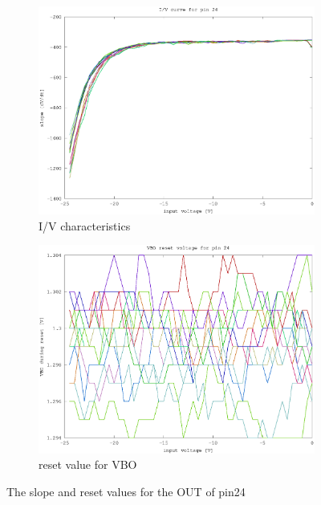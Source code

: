 \begin{figure}[h]
	\centering
	\begin{subfigure}[b]{0.475\textwidth}
	    \centering
	    \includegraphics[width=\textwidth]{fig/pin24_slope_-25-0V.eps}
	    \caption[Network2]%
	    {I/V characteristics}    
	    \label{fig:pin24_slope}
	\end{subfigure}
	\hfill
	\begin{subfigure}[b]{0.475\textwidth}  
	    \centering 
	    \includegraphics[width=\textwidth]{fig/pin24_reset_-25-0V.eps}
	    \caption[]%
	    {reset value for VBO}    
	    \label{fig:pin24_reset}
	\end{subfigure}
	\caption{The slope and reset values for the OUT of pin24}
	\label{fig:pin32}
\end{figure}


